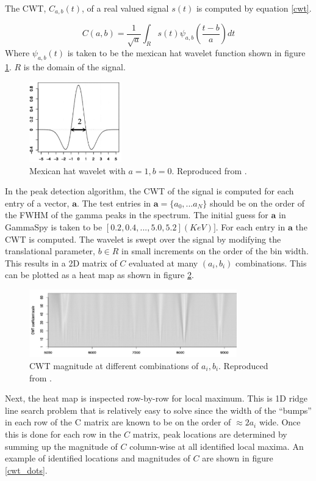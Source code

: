 \documentclass[10pt]{article}
\begin{document}
The CWT, $C_{a,b}(t)$, of a real valued  signal $s(t)$ is computed by equation \ref{cwt}.

\begin{equation}
    C(a,b) = \frac{1}{\sqrt a}\int_R s(t) \psi_{a,b}(\frac{t-b}{a}) dt
    \label{cwt}
\end{equation}
Where $\psi_{a,b}(t)$ is taken to be the mexican hat wavelet function shown in figure \ref{mhat}.
$R$ is the domain of the signal.

\begin{figure}[!htbp]
\centering
\includegraphics[width=4cm]{images/mexican_hat.png}
\caption{Mexican hat wavelet with $a=1, b=0$. Reproduced from \cite{Du:2006}.}
\label{mhat}
\end{figure}

In the peak detection algorithm, the CWT of the signal is computed for
each entry of a vector, $\bm a$.  The test entries in $\bm a =\{a_0, ... a_N\}$ should
be on the order of the FWHM of the gamma peaks in the spectrum.  The initial
guess for $\bm a$ in GammaSpy is taken to be $[0.2, 0.4, ..., 5.0, 5.2] (KeV)]$.
For each entry in $\bm a$ the CWT is computed.
The wavelet is swept over the signal by modifying the translational parameter, $b \in R$ in small increments on the order of the bin width.
This results in a 2D matrix of $C$ evaluated at many $(a_i, b_i)$ combinations. This can be plotted
as a heat map as shown in figure \ref{cwt_scale}. \\

\begin{figure}[!htbp]
\centering
\includegraphics[width=9cm]{images/cwt_scale.png}
\caption{CWT magnitude at different combinations of $a_i, b_i$. Reproduced from \cite{Du:2006}.}
\label{cwt_scale}
\end{figure}

Next, the heat map is inspected row-by-row for local maximum.  This is 1D ridge line search problem
that is relatively easy to solve since the width of the ``bumps'' in each row of the C matrix are known to be
on the order of $\approx 2a_i$ wide.  Once this is done for each row in the $C$ matrix,
peak locations are determined by summing up the magnitude of $C$ column-wise at all identified local maxima.
An example of identified locations and magnitudes of $C$ are shown in figure \ref{cwt_dots}. \\
\end{document}
